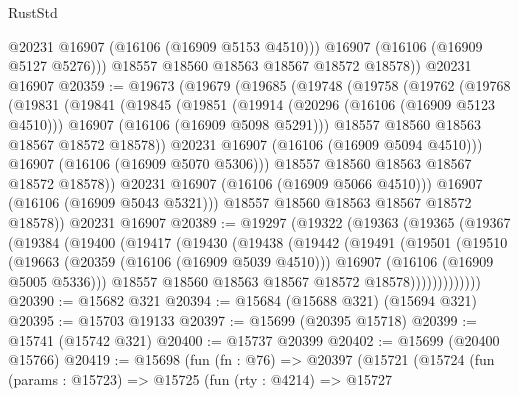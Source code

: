 \begin{lexlean}{RustStd}
\begin{coremodule}
            @20231
            @16907
            (@16106 (@16909 @5153 @4510)))
          @16907
          (@16106 (@16909 @5127 @5276)))
        @18557
        @18560
        @18563
        @18567
        @18572
        @18578))
    @20231
    @16907
@20359 := @19673
    (@19679
      (@19685
        (@19748
          (@19758
            (@19762
              (@19768
                (@19831
                  (@19841
                    (@19845
                      (@19851
                        (@19914
                          (@20296 (@16106 (@16909 @5123 @4510)))
                          @16907
                          (@16106 (@16909 @5098 @5291)))
                        @18557
                        @18560
                        @18563
                        @18567
                        @18572
                        @18578))
                    @20231
                    @16907
                    (@16106 (@16909 @5094 @4510)))
                  @16907
                  (@16106 (@16909 @5070 @5306)))
                @18557
                @18560
                @18563
                @18567
                @18572
                @18578))
            @20231
            @16907
            (@16106 (@16909 @5066 @4510)))
          @16907
          (@16106 (@16909 @5043 @5321)))
        @18557
        @18560
        @18563
        @18567
        @18572
        @18578))
    @20231
    @16907
@20389 := @19297
    (@19322
      (@19363
        (@19365
          (@19367
            (@19384
              (@19400
                (@19417
                  (@19430
                    (@19438
                      (@19442
                        (@19491
                          (@19501
                            (@19510
                              (@19663
                                (@20359 (@16106 (@16909 @5039 @4510)))
                                @16907
                                (@16106 (@16909 @5005 @5336)))
                              @18557
                              @18560
                              @18563
                              @18567
                              @18572
                              @18578)))))))))))))
@20390 := @15682 @321
@20394 := @15684 (@15688 @321) (@15694 @321)
@20395 := @15703 @19133
@20397 := @15699 (@20395 @15718)
@20399 := @15741 (@15742 @321)
@20400 := @15737 @20399
@20402 := @15699 (@20400 @15766)
@20419 := @15698
    (fun (fn : @76) =>
    @20397
      (@15721
        (@15724
          (fun (params : @15723) =>
          @15725
            (fun (rty : @4214) =>
            @15727

\end{coremodule}
\end{lexlean}
